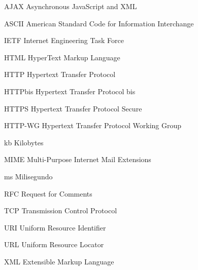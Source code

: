 %
%

\begin{siglas}
	\item[AJAX] Asynchronous JavaScript and XML
	\item[ASCII] American Standard Code for Information Interchange
	\item[IETF] Internet Engineering Task Force
    \item[HTML] HyperText Markup Language
    \item[HTTP] Hypertext Transfer Protocol
    \item[HTTPbis] Hypertext Transfer Protocol bis
	\item[HTTPS] Hypertext Transfer Protocol Secure
    \item[HTTP-WG] Hypertext Transfer Protocol Working Group
    \item[kb] Kilobytes
    \item[MIME] Multi-Purpose Internet Mail Extensions
    \item[ms] Milisegundo
    \item[RFC] Request for Comments
    \item[TCP] Transmission Control Protocol
    \item[URI] Uniform Resource Identifier
    \item[URL] Uniform Resource Locator
    \item[XML] Extensible Markup Language
\end{siglas}
